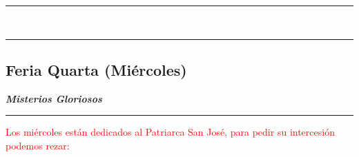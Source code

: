 \documentclass[10pt,twoside]{book}
\begin{document}
\begin{center}
      \begin{spacing}{0.25}
            {\rule{20em}{0.4pt}}\\
            {\rule{20em}{0.4pt}}
      \end{spacing}
\end{center}


\begin{center}
      \section*{Feria Quarta (Miércoles)}

      \textbf{\textsl{\large Misterios Gloriosos}}
\end{center}

\vspace{0.5em}



\vspace{0.5em}



\vspace{0.75em}





\vspace{0.75em}





\vspace{0.75em}





\vspace{0.75em}



{}

\iralfinal

\begin{center}
      {\rule{10em}{0.4pt}}

      \vspace{0.75em}

      \textcolor{red}{Los miércoles están dedicados al Patriarca San José, para pedir su intercesión podemos rezar:}
\end{center}
\vspace{-1.5em}
\begin{multicols}{2}
      
\end{multicols}
\end{document}
